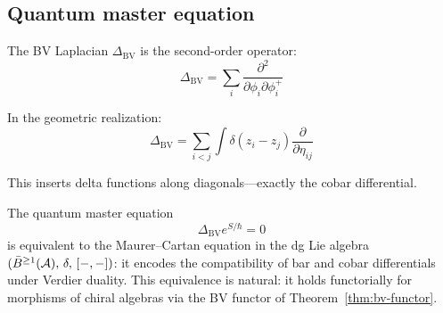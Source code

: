 \subsection{Quantum master equation}

\begin{definition}[BV Laplacian]
The BV Laplacian $\Delta_{\text{BV}}$ is the second-order operator:
\[\Delta_{\text{BV}} = \sum_i \frac{\partial^2}{\partial \phi_i \partial \phi_i^+}\]

In the geometric realization:
\[\Delta_{\text{BV}} = \sum_{i<j} \int \delta(z_i - z_j) 
\frac{\partial}{\partial \eta_{ij}}\]

This inserts delta functions along diagonals—exactly the cobar differential.
\end{definition}

\begin{theorem}
\label{thm:qme-bar-cobar}
The quantum master equation
\[\Delta_{\text{BV}} e^{S/\hbar} = 0\]
is equivalent to the Maurer--Cartan equation in the dg Lie algebra
$(\bar{B}^{\ge 1}(\mathcal{A}),\, \delta,\, [-,-])$: it encodes the
compatibility of bar and cobar differentials under Verdier duality.
This equivalence is natural: it holds functorially for morphisms of
chiral algebras via the BV functor of Theorem~\ref{thm:bv-functor}.
\end{theorem}

